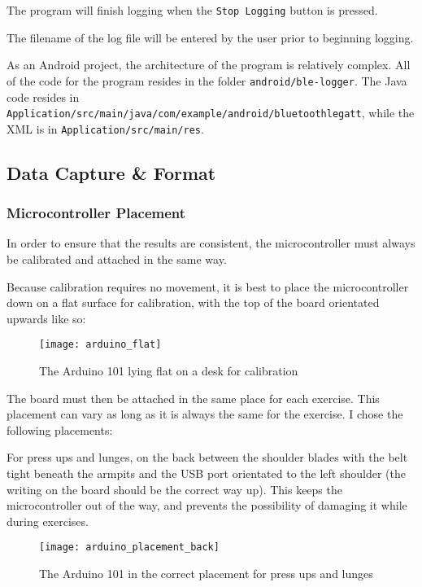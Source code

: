 \documentclass[a4paper]{article}
\begin{document}
The program will finish logging when the \lstinline{Stop Logging} button is pressed.

The filename of the log file will be entered by the user prior to beginning logging.

As an Android project, the architecture of the program is relatively complex. All of the code for the program resides in the folder \lstinline{android/ble-logger}. The Java code resides in \lstinline{Application/src/main/java/com/example/android/bluetoothlegatt}, while the XML is in \lstinline{Application/src/main/res}. 

\subsection{Data Capture \& Format}%
\label{subsec:dc_datacapture}

\subsubsection{Microcontroller Placement}
\label{subsubsec:dc_dc_placement}

In order to ensure that the results are consistent, the microcontroller must always be calibrated and attached in the same way.

Because calibration requires no movement, it is best to place the microcontroller down on a flat surface for calibration, with the top of the board orientated upwards like so:

\begin{figure}[H]
    \centering
        \texttt{[image: arduino\_flat]}
        \caption{The Arduino 101 lying flat on a desk for calibration}
        \label{fig:ar_flat}
\end{figure}

The board must then be attached in the same place for each exercise. This placement can vary as long as it is always the same for the exercise. I chose the following placements:

For press ups and lunges, on the back between the shoulder blades with the belt tight beneath the armpits and the USB port orientated to the left shoulder (the writing on the board should be the correct way up). This keeps the microcontroller out of the way, and prevents the possibility of damaging it while during exercises.

\begin{figure}[H]
    \centering
        \texttt{[image: arduino\_placement\_back]}
        \caption{The Arduino 101 in the correct placement for press ups and lunges}
        \label{fig:ar_placement_back}
\end{figure}
\end{document}
